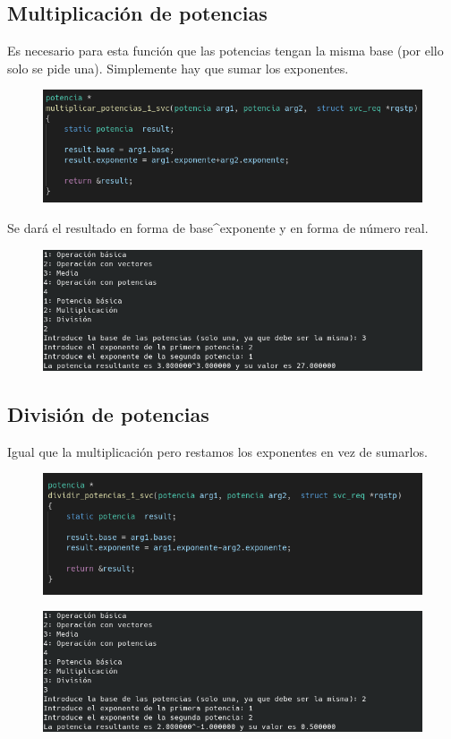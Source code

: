 \documentclass{article}
\begin{document}
	\subsection{Multiplicación de potencias}
	Es necesario para esta función que las potencias tengan la misma base (por ello solo se pide una). Simplemente hay que sumar los exponentes.
	\begin{figure}[H]
		\centering
		\includegraphics[totalheight=3.7cm]{img/24.png}
	\end{figure}
	Se dará el resultado en forma de base\textasciicircum{}exponente y en forma de número real.
	\begin{figure}[H]
		\centering
		\includegraphics[totalheight=4cm]{img/25.png}
	\end{figure}
	\subsection{División de potencias}
	Igual que la multiplicación pero restamos los exponentes en vez de sumarlos.
	\begin{figure}[H]
		\centering
		\includegraphics[totalheight=4cm]{img/26.png}
	\end{figure}
	\begin{figure}[H]
		\centering
		\includegraphics[totalheight=4cm]{img/27.png}
	\end{figure}
\end{document}
